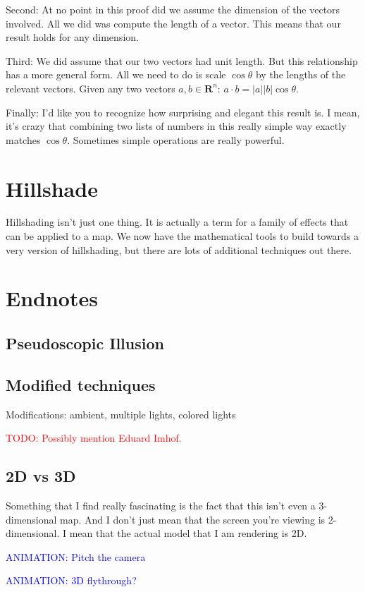 \documentclass{article}
\newcommand\todo[1]{\textcolor{red}{TODO: #1}}
\newcommand\animation[1]{\textcolor{blue}{ANIMATION: #1}}
\begin{document}
Second: At no point in this proof did we assume the dimension of the vectors involved.
All we did was compute the length of a vector.
This means that our result holds for any dimension.

Third: We did assume that our two vectors had unit length.
But this relationship has a more general form.
All we need to do is scale $\cos \theta$ by the lengths of the relevant vectors.
Given any two vectors $ a, b \in \mathbf{R}^n$: $a \cdot b = |a| |b| \cos \theta$.

Finally: I'd like you to recognize how surprising and elegant this result is.
I mean, it's crazy that combining two lists of numbers in this really simple way exactly matches $\cos \theta$.
Sometimes simple operations are really powerful.

\section{Hillshade}

Hillshading isn't just one thing.
It is actually a term for a family of effects that can be applied to a map.
We now have the mathematical tools to build towards a very version of hillshading, but there are lots of additional techniques out there.

\section{Endnotes}

\subsection{Pseudoscopic Illusion}

\subsection{Modified techniques}

Modifications: ambient, multiple lights, colored lights

\todo{Possibly mention Eduard Imhof.}

\subsection{2D vs 3D}

Something that I find really fascinating is the fact that this isn't even a 3-dimensional map.
And I don't just mean that the screen you're viewing is 2-dimensional.
I mean that the actual model that I am rendering is 2D.

\animation{Pitch the camera}

\animation{3D flythrough?}
\end{document}
